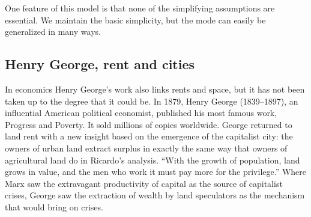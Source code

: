 One feature of this model is that none of the simplifying assumptions are essential. We maintain the basic simplicity, but the mode can easily be generalized in many ways. 

\subsection{Henry George, rent and cities} 


In economics Henry George's work also links rents and space, but it has not been taken up to the degree that it could be. 
In 1879, Henry George (1839--1897), an influential American political economist, published his most famous work, Progress and Poverty\cite{georgeProgressPovertyInquiry1973}. It sold millions of copies worldwide. George returned to land rent with a new insight based on the emergence of the capitalist city: the owners of urban land extract surplus in exactly the same way that owners of agricultural land do in Ricardo's analysis. ``With the growth of population, land grows in value, and the men who work it must pay more for the privilege.''  Where Marx saw the extravagant productivity of capital as the source of capitalist crises, George saw the extraction of wealth by land speculators as the mechanism that would bring on crises.
  
